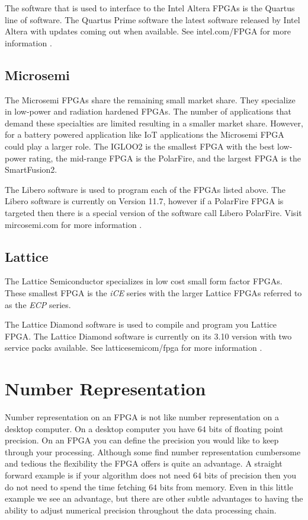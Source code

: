 The software that is used to interface to the Intel Altera \ac{FPGA}s is the Quartus line of software. The Quartus Prime software the latest software released by Intel Altera with updates coming out when available. See intel.com/FPGA for more information \cite{alteraref}.
	
\subsection{Microsemi}

The Microsemi \ac{FPGA}s share the remaining small market share. They specialize in low-power and radiation hardened \ac{FPGA}s. The number of applications that demand these specialties are limited resulting in a smaller market share. However, for a battery powered application like \ac{IoT} applications the Microsemi \ac{FPGA} could play a larger role. The IGLOO2 is the smallest \ac{FPGA} with the best low-power rating, the mid-range \ac{FPGA} is the PolarFire, and the largest \ac{FPGA} is the SmartFusion2. 

The Libero software is used to program each of the \ac{FPGA}s listed above. The Libero software is currently on Version 11.7, however if a PolarFire \ac{FPGA} is targeted then there is a special version of the software call Libero PolarFire. Visit	mircosemi.com for more information \cite{microref}. 
	
\subsection{Lattice}
	
The Lattice Semiconductor specializes in low cost small form factor \ac{FPGA}s. These smallest \ac{FPGA} is the \emph{iCE} series with the larger Lattice \ac{FPGA}s referred to as the \emph{ECP} series. 

The Lattice Diamond software is used to compile and program you Lattice FPGA. The Lattice Diamond software is currently on its 3.10 version with two service packs available. See latticesemicom/fpga for more information \cite{latref}. 

\section{Number Representation}

Number representation on an \ac{FPGA} is not like number representation on a desktop computer. On a desktop computer you have $64$ bits of floating point precision. On an \ac{FPGA} you can define the precision you would like to keep through your processing. Although some find number representation cumbersome and tedious the flexibility the \ac{FPGA} offers is quite an advantage. A straight forward example is if your algorithm does not need $64$ bits of precision then you do not need to spend the time fetching $64$ bits from memory. Even in this little example we see an advantage, but there are other subtle advantages to having the ability to adjust numerical precision throughout the data processing chain.

